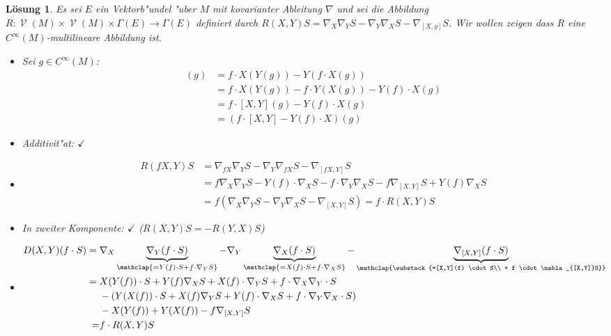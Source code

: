 \documentclass[paper=A4, twoside, chapterprefix=true, bibliography=totoc, headsepline]{scrbook}
\DeclareMathOperator{\calV}{\mathcal{V}}
\newcommand{\X}{\times}
\theoremstyle{plain}
\theoremstyle{nonumberplain}
\theoremstyle{empty}
\theoremstyle{break}
\newtheorem{Loes}{L\"osung}
\begin{document}
\begin{Loes}
Es sei $E$ ein Vektorb"undel "uber $M$ mit kovarianter Ableitung $\nabla$ und sei die Abbildung $R: \calV(M) \X \calV(M) \X \Gamma(E) \to \Gamma(E)$ definiert durch $R(X, Y)S = \nabla_X\nabla_YS - \nabla_Y\nabla_XS - \nabla_{[X,y]}S$. Wir wollen zeigen dass $R$ eine $C^\infty(M)$-multilineare Abbildung ist.
\begin{itemize}[leftmargin=*]
\item
	Sei $g \in C^\infty(M)$:
	\begin{align*}
		[fX,Y](g) &= f \cdot X(Y(g)) - Y(f \cdot X(g))\\
		&= f \cdot X(Y(g)) - f \cdot Y(X(g)) - Y(f) \cdot X(g)\\
		&= f \cdot [X,Y](g) - Y(f) \cdot X(g)\\
		&= (f \cdot [X,Y] - Y(f) \cdot X)(g)
	\end{align*}
\item
	Additivit"at: $\checkmark$
\item
	\begin{align*}
		R(fX,Y)S &= \nabla_{fX}\nabla_YS - \nabla_Y\nabla_{fX}S - \nabla_{[fX,Y]}S\\
		&= f\nabla_X\nabla_YS - Y(f) \cdot \nabla_XS - f \cdot \nabla_Y\nabla_XS - f\nabla_{[X,Y]}S + Y(f)\nabla_XS\\
		&= f(\nabla_X\nabla_YS - \nabla_Y\nabla_XS - \nabla_{[X,Y]}S) = f \cdot R(X,Y) S
	\end{align*}
\item
	In zweiter Komponente: $\checkmark$ ($R(X,Y)S = -R(Y,X)S$)
\item
	\begin{align*}
		D(X,Y)(f \cdot S) = {} & \nabla_X\underbrace{\nabla_Y(f \cdot S)}_{\mathclap{=Y(f)\cdot S + f \cdot \nabla_YS}} - \nabla_Y\underbrace{\nabla_X(f\cdot S)}_{\mathclap{=X(f) \cdot S + f \cdot \nabla_XS}} - \underbrace{\nabla_{[X,Y]}(f\cdot S)}_{\mathclap{\substack{=[X,Y](f) \cdot S\\ + f \cdot \nabla_{[X,Y]}S}}}\\
		= {} & X(Y(f)) \cdot S + Y(f)\nabla_XS + X(f) \cdot \nabla_YS + f \cdot \nabla_X\nabla_Y \cdot S\\
		 & -(Y(X(f)) \cdot S + X(f)\nabla_YS + Y(f)\cdot\nabla_XS + f\cdot\nabla_Y\nabla_X\cdot S)\\
		 & -X(Y(f)) + Y(X(f)) - f\nabla_{[X,Y]}S \\ =& f \cdot R(X,Y)S
	\end{align*}
\end{itemize}\end{Loes}
\end{document}

